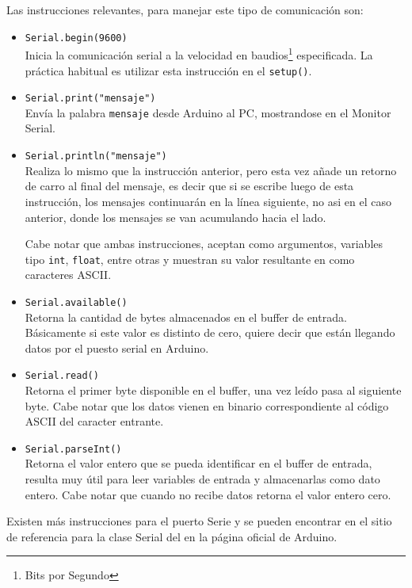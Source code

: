 \documentclass[letterpaper, 10pt]{report}
\begin{document}
Las instrucciones relevantes, para manejar este tipo de comunicación son:
\begin{itemize}
\item \texttt{Serial.begin(9600)}\\
Inicia la comunicación serial a la velocidad en baudios\footnote{Bits por Segundo} especificada. La práctica habitual es utilizar esta instrucción en el \texttt{setup()}.

\item \texttt{Serial.print("mensaje")}\\
Envía la palabra \texttt{mensaje} desde Arduino al PC, mostrandose en el Monitor Serial.

\item \texttt{Serial.println("mensaje")}\\
Realiza lo mismo que la instrucción anterior, pero esta vez añade un retorno de carro al final del mensaje, es decir que si se escribe luego de esta instrucción, los mensajes continuarán en la línea siguiente, no asi en el caso anterior, donde los mensajes se van acumulando hacia el lado.

Cabe notar que ambas instrucciones, aceptan como argumentos, variables tipo \texttt{int}, \texttt{float}, entre otras y muestran su valor resultante en como caracteres ASCII.

\item \texttt{Serial.available()}\\
Retorna la cantidad de bytes almacenados en el buffer de entrada. Básicamente si este valor es distinto de cero, quiere decir que están llegando datos por el puesto serial en Arduino.

\item \texttt{Serial.read()}\\
Retorna el primer byte disponible en el buffer, una vez leído pasa al siguiente byte. Cabe notar que los datos vienen en binario correspondiente al código ASCII del caracter entrante.

\item \texttt{Serial.parseInt()}\\
Retorna el valor entero que se pueda identificar en el buffer de entrada, resulta muy útil para leer variables de entrada y almacenarlas como dato entero. Cabe notar que cuando no recibe datos retorna el valor entero cero.
\end{itemize}

Existen más instrucciones para el puerto Serie y se pueden encontrar en el sitio de referencia para la clase Serial del en la página oficial de Arduino. \cite{Serial} 
\end{document}
